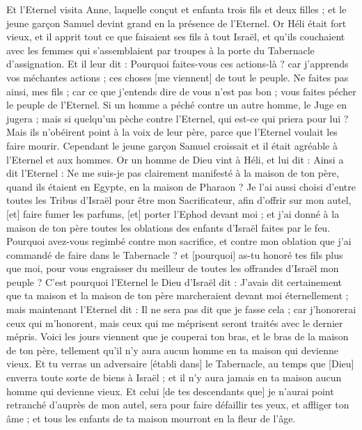 \begin{multicols}{2}
Et l'Eternel visita Anne, laquelle conçut et enfanta trois fils et deux filles ; et le jeune garçon Samuel devint grand en la présence de l'Eternel.
Or Héli était fort vieux, et il apprit tout ce que faisaient ses fils à tout Israël, et qu'ils couchaient avec les femmes qui s'assemblaient par troupes à la porte du Tabernacle d'assignation.
Et il leur dit : Pourquoi faites-vous ces actions-là ? car j'apprends vos méchantes actions ; ces choses [me viennent] de tout le peuple.
Ne faites pas ainsi, mes fils ; car ce que j'entends dire de vous n'est pas bon ; vous faites pécher le peuple de l'Eternel.
Si un homme a péché contre un autre homme, le Juge en jugera ; mais si quelqu'un pèche contre l'Eternel, qui est-ce qui priera pour lui ? Mais ils n'obéirent point à la voix de leur père, parce que l'Eternel voulait les faire mourir.
Cependant le jeune garçon Samuel croissait et il était agréable à l'Eternel et aux hommes.
Or un homme de Dieu vint à Héli, et lui dit : Ainsi a dit l'Eternel : Ne me suis-je pas clairement manifesté à la maison de ton père, quand ils étaient en Egypte, en la maison de Pharaon ?
Je l'ai aussi choisi d'entre toutes les Tribus d'Israël pour être mon Sacrificateur, afin d'offrir sur mon autel, [et] faire fumer les parfums, [et] porter l'Ephod devant moi ; et j'ai donné à la maison de ton père toutes les oblations des enfants d'Israël faites par le feu.
Pourquoi avez-vous regimbé contre mon sacrifice, et contre mon oblation que j'ai commandé de faire dans le Tabernacle ? et [pourquoi] as-tu honoré tes fils plus que moi, pour vous engraisser du meilleur de toutes les offrandes d'Israël mon peuple ?
C'est pourquoi l'Eternel le Dieu d'Israël dit : J'avais dit certainement que ta maison et la maison de ton père marcheraient devant moi éternellement ; mais maintenant l'Eternel dit : Il ne sera pas dit que je fasse cela ; car j'honorerai ceux qui m'honorent, mais ceux qui me méprisent seront traités avec le dernier mépris.
Voici les jours viennent que je couperai ton bras, et le bras de la maison de ton père, tellement qu'il n'y aura aucun homme en ta maison qui devienne vieux.
Et tu verras un adversaire [établi dans] le Tabernacle, au temps que [Dieu] enverra toute sorte de biens à Israël ; et il n'y aura jamais en ta maison aucun homme qui devienne vieux.
Et celui [de tes descendants que] je n'aurai point retranché d'auprès de mon autel, sera pour faire défaillir tes yeux, et affliger ton âme ; et tous les enfants de ta maison mourront en la fleur de l'âge.

\end{multicols}
